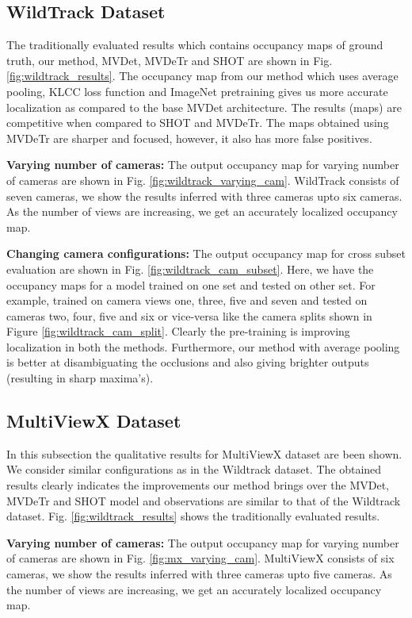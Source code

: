 \documentclass[letterpaper, 10 pt, conference]{ieeeconf}  \usepackage{times}
\newcommand{\wildtrack}{WildTrack }
\newcommand{\multiviewx}{MultiViewX }
\begin{document}
\subsection{\wildtrack Dataset}
The traditionally evaluated results which contains occupancy maps of ground truth, our method, MVDet, MVDeTr and SHOT are shown in Fig. \ref{fig:wildtrack_results}. The occupancy map from our method which uses average pooling, KLCC loss function and ImageNet pretraining gives us more accurate localization as compared to the base MVDet architecture. The results (maps) are competitive when compared to SHOT and MVDeTr. The maps obtained using MVDeTr are sharper and focused, however, it also has more false positives. 


\textbf{Varying number of cameras:} The output occupancy map for varying number of cameras are shown in Fig. \ref{fig:wildtrack_varying_cam}. \wildtrack consists of seven cameras, we show the results inferred with three cameras upto six cameras. As the number of views are increasing, we get an accurately localized occupancy map. 


\textbf{Changing camera configurations:} The output occupancy map for cross subset evaluation are shown in Fig. \ref{fig:wildtrack_cam_subset}. Here, we have the occupancy maps for a model trained on one set and tested on other set. For example, trained on camera views one, three, five and seven and tested on cameras two, four, five and six or vice-versa like the camera splits shown in Figure \ref{fig:wildtrack_cam_split}. Clearly the pre-training is improving localization in both the methods. Furthermore, our method with average pooling is better at disambiguating the occlusions and also giving brighter outputs (resulting in sharp maxima's).


\subsection{\multiviewx Dataset}
In this subsection the qualitative results for \multiviewx dataset are been shown. We consider similar configurations as in the Wildtrack dataset. The obtained results clearly indicates the improvements our method brings over the MVDet, MVDeTr and SHOT model and observations are similar to that of the Wildtrack dataset.  Fig. \ref{fig:wildtrack_results} shows the traditionally evaluated results.


\textbf{Varying number of cameras:} The output occupancy map for varying number of cameras are shown in Fig. \ref{fig:mx_varying_cam}. \multiviewx consists of six cameras, we show the results inferred with three cameras upto five cameras. As the number of views are increasing, we get an accurately localized occupancy map. 
\end{document}
